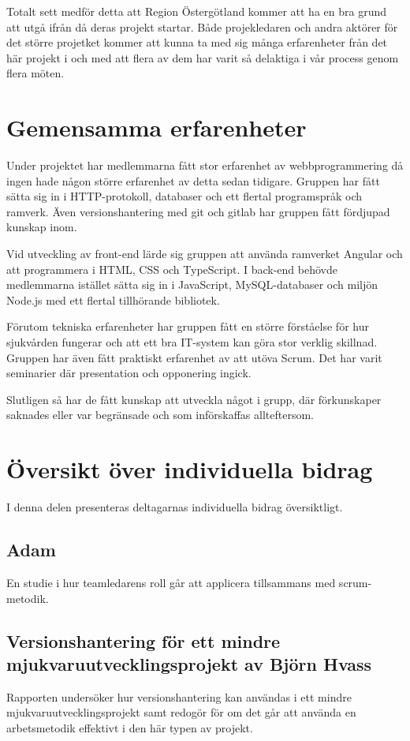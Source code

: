Totalt sett medför detta att Region Östergötland kommer att ha en bra grund att utgå ifrån då deras projekt startar. Både projekledaren och andra aktörer för det större projetket kommer att kunna ta med sig många erfarenheter från det här projekt i och med att flera av dem har varit så delaktiga i vår process genom flera möten.

\section{Gemensamma erfarenheter}
Under projektet har medlemmarna fått stor erfarenhet av webbprogrammering då ingen hade någon större erfarenhet av detta sedan tidigare. Gruppen har fått sätta sig in i HTTP-protokoll, databaser och ett flertal programspråk och ramverk. Även versionshantering med git och gitlab har gruppen fått fördjupad kunskap inom.

Vid utveckling av front-end lärde sig gruppen att använda ramverket Angular och att programmera i HTML, CSS och TypeScript. I back-end behövde medlemmarna istället sätta sig in i JavaScript, MySQL-databaser och miljön Node.js med ett flertal tillhörande bibliotek.

Förutom tekniska erfarenheter har gruppen fått en större förståelse för hur sjukvården fungerar och att ett bra IT-system kan göra stor verklig skillnad. Gruppen har även fått praktiskt erfarenhet av att utöva Scrum. Det har varit seminarier där presentation och opponering ingick.

Slutligen så har de fått kunskap att utveckla något i grupp, där förkunskaper saknades eller var begränsade och som införskaffas allteftersom.

\section{Översikt över individuella bidrag}
I denna delen presenteras deltagarnas individuella bidrag översiktligt.

\subsection{Adam}
En studie i hur teamledarens roll går att applicera tillsammans med scrum-metodik.
\subsection{Versionshantering för ett mindre mjukvaruutvecklingsprojekt av Björn Hvass}
Rapporten undersöker hur versionshantering kan användas i ett mindre mjukvaruutvecklingsprojekt samt redogör för om det går att använda en arbetsmetodik effektivt i den här typen av projekt.

